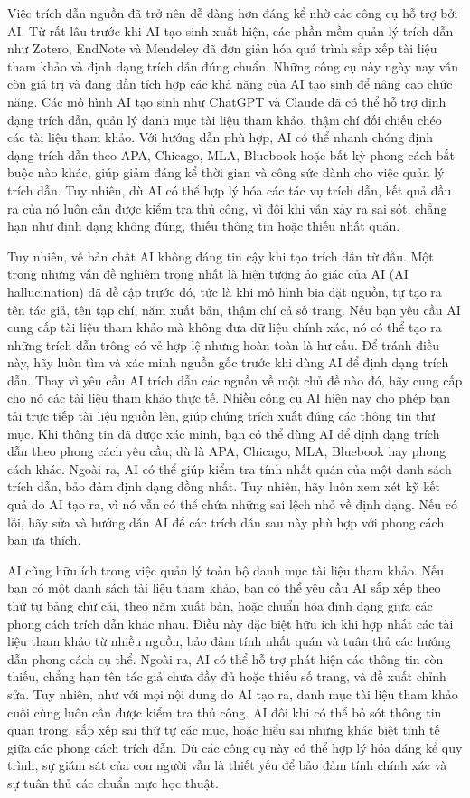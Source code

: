 Việc trích dẫn nguồn đã trở nên dễ dàng hơn đáng kể nhờ các công cụ hỗ trợ bởi AI. Từ rất lâu trước khi AI tạo sinh xuất hiện, các phần mềm quản lý trích dẫn như Zotero, EndNote và Mendeley đã đơn giản hóa quá trình sắp xếp tài liệu tham khảo và định dạng trích dẫn đúng chuẩn. Những công cụ này ngày nay vẫn còn giá trị và đang dần tích hợp các khả năng của AI tạo sinh để nâng cao chức năng. Các mô hình AI tạo sinh như ChatGPT và Claude đã có thể hỗ trợ định dạng trích dẫn, quản lý danh mục tài liệu tham khảo, thậm chí đối chiếu chéo các tài liệu tham khảo. Với hướng dẫn phù hợp, AI có thể nhanh chóng định dạng trích dẫn theo APA, Chicago, MLA, Bluebook hoặc bất kỳ phong cách bắt buộc nào khác, giúp giảm đáng kể thời gian và công sức dành cho việc quản lý trích dẫn. Tuy nhiên, dù AI có thể hợp lý hóa các tác vụ trích dẫn, kết quả đầu ra của nó luôn cần được kiểm tra thủ công, vì đôi khi vẫn xảy ra sai sót, chẳng hạn như định dạng không đúng, thiếu thông tin hoặc thiếu nhất quán.

Tuy nhiên, về bản chất AI không đáng tin cậy khi tạo trích dẫn từ đầu. Một trong những vấn đề nghiêm trọng nhất là hiện tượng ảo giác của AI (AI hallucination) đã đề cập trước đó, tức là khi mô hình bịa đặt nguồn, tự tạo ra tên tác giả, tên tạp chí, năm xuất bản, thậm chí cả số trang. Nếu bạn yêu cầu AI cung cấp tài liệu tham khảo mà không đưa dữ liệu chính xác, nó có thể tạo ra những trích dẫn trông có vẻ hợp lệ nhưng hoàn toàn là hư cấu. Để tránh điều này, hãy luôn tìm và xác minh nguồn gốc trước khi dùng AI để định dạng trích dẫn. Thay vì yêu cầu AI trích dẫn các nguồn về một chủ đề nào đó, hãy cung cấp cho nó các tài liệu tham khảo thực tế. Nhiều công cụ AI hiện nay cho phép bạn tải trực tiếp tài liệu nguồn lên, giúp chúng trích xuất đúng các thông tin thư mục. Khi thông tin đã được xác minh, bạn có thể dùng AI để định dạng trích dẫn theo phong cách yêu cầu, dù là APA, Chicago, MLA, Bluebook hay phong cách khác. Ngoài ra, AI có thể giúp kiểm tra tính nhất quán của một danh sách trích dẫn, bảo đảm định dạng đồng nhất. Tuy nhiên, hãy luôn xem xét kỹ kết quả do AI tạo ra, vì nó vẫn có thể chứa những sai lệch nhỏ về định dạng. Nếu có lỗi, hãy sửa và hướng dẫn AI để các trích dẫn sau này phù hợp với phong cách bạn ưa thích.

AI cũng hữu ích trong việc quản lý toàn bộ danh mục tài liệu tham khảo. Nếu bạn có một danh sách tài liệu tham khảo, bạn có thể yêu cầu AI sắp xếp theo thứ tự bảng chữ cái, theo năm xuất bản, hoặc chuẩn hóa định dạng giữa các phong cách trích dẫn khác nhau. Điều này đặc biệt hữu ích khi hợp nhất các tài liệu tham khảo từ nhiều nguồn, bảo đảm tính nhất quán và tuân thủ các hướng dẫn phong cách cụ thể. Ngoài ra, AI có thể hỗ trợ phát hiện các thông tin còn thiếu, chẳng hạn tên tác giả chưa đầy đủ hoặc thiếu số trang, và đề xuất chỉnh sửa. Tuy nhiên, như với mọi nội dung do AI tạo ra, danh mục tài liệu tham khảo cuối cùng luôn cần được kiểm tra thủ công. AI đôi khi có thể bỏ sót thông tin quan trọng, sắp xếp sai thứ tự các mục, hoặc hiểu sai những khác biệt tinh tế giữa các phong cách trích dẫn. Dù các công cụ này có thể hợp lý hóa đáng kể quy trình, sự giám sát của con người vẫn là thiết yếu để bảo đảm tính chính xác và sự tuân thủ các chuẩn mực học thuật.

